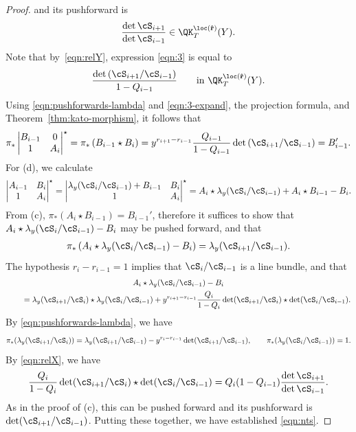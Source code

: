 \begin{proof}
 and its pushforward is
\begin{gather}\label{eqn:3}
 \frac{\det\cS_{i+1}}{\det\cS_{i-1}}\in \QK_T^{\loc(\mathbf{\hat r})}(Y).
\end{gather}
Note that by~\eqref{eqn:relY},
expression \eqref{eqn:3} is equal to
\begin{gather*}
 \frac{\det\left(\cS_{i+1}/\cS_{i-1}\right)}{1-Q_{i-1}}\qquad \text{in} \ \QK_T^{\loc(\mathbf{\hat r})}(Y).
\end{gather*}
Using \eqref{eqn:pushforwards-lambda} and \eqref{eqn:3-expand}, the projection formula, and Theorem~\ref{thm:kato-morphism}, it follows that
\begin{gather*}
 \pi_*\begin{vmatrix}
 B_{i-1} & 0\\
 1 & A_{i}
 \end{vmatrix}^\star=\pi_*\left(B_{i-1}\star B_i\right)=y^{r_{i+1}-r_{i-1}}\frac{Q_{i-1}}{1-Q_{i-1}}\det\left(\cS_{i+1}/\cS_{i-1}\right)=B'_{i-1}.
\end{gather*}
 For (d), we calculate
 \[ \begin{vmatrix}
 A_{i-1} & B_i\\1 & A_i
 \end{vmatrix}^\star
 = \begin{vmatrix}
 \lambda_y(\cS_{i}/\cS_{i-1}) + B_{i-1} & B_i\\1 & A_i
 \end{vmatrix}^\star
 = A_i \star \lambda_y(\cS_{i}/\cS_{i-1}) + A_i \star B_{i-1} - B_i. \]
 From (c), $\pi_* (A_i \star B_{i-1}) = B_{i-1}'$, therefore it suffices to show that
 $A_i \star \lambda_y(\cS_{i}/\cS_{i-1}) - B_i$ may be pushed forward, and that
 \begin{gather}\label{eqn:nts}
 \pi_*\left(A_i \star \lambda_y(\cS_{i}/\cS_{i-1}) - B_i\right) = \lambda_y(\cS_{i+1}/\cS_{i-1}) .
 \end{gather}
 The hypothesis $r_i - r_{i-1} =1$ implies that $\cS_i/\cS_{i-1}$ is a line bundle, and that
 \begin{gather*}%
 A_i \star \lambda_y(\cS_{i}/\cS_{i-1}) - B_i\\
 \qquad{} = \lambda_y(\cS_{i+1}/\cS_{i}) \star \lambda_y(\cS_{i}/\cS_{i-1})
 + y^{r_{i+1}-r_{i-1}} \frac{Q_i}{1-Q_i} \det (\cS_{i+1}/\cS_{i}) \star \det (\cS_{i}/\cS_{i-1}) .
 \end{gather*}
 By \eqref{eqn:pushforwards-lambda}, we have
 \[
 \pi_*(\lambda_y(\cS_{i+1}/\cS_{i}))=\lambda_y(\cS_{i+1}/\cS_{i-1})-y^{r_i-r_{i-1}}\det(\cS_{i+1}/\cS_{i-1}), \qquad\pi_*(\lambda_y(\cS_{i}/\cS_{i-1}))=1.
 \]
 By \eqref{eqn:relX}, we have
 \[
 \frac{Q_i}{1-Q_i} \det (\cS_{i+1}/\cS_{i}) \star \det (\cS_{i}/\cS_{i-1}) = Q_i(1-Q_{i-1})\frac{\det\cS_{i+1}}{\det \cS_{i-1}}.
 \]
 As in the proof of (c), this can be pushed forward and its pushforward is $\det(\cS_{i+1}/\cS_{i-1})$. Putting these together, we have established \eqref{eqn:nts}.
\end{proof}

